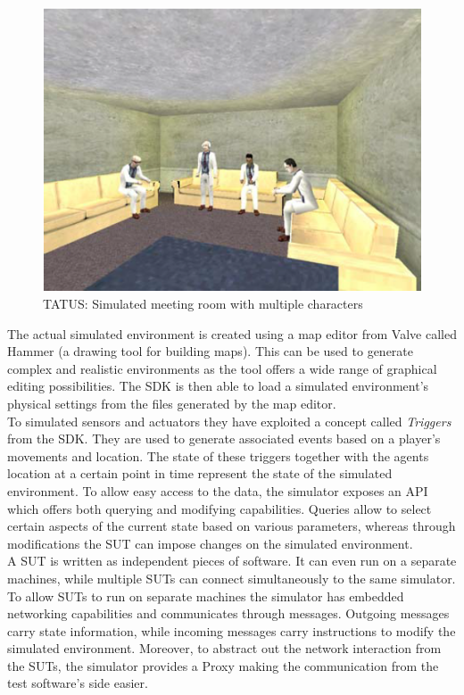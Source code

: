 \begin{figure}[H]
	\centering
	\includegraphics[width=\linewidth]{gfx/Chapter2/tatus_simulated_meeting_room}
	\caption{TATUS: Simulated meeting room with multiple characters}
	\label{fig:tatus_simulated_meeting_room}
\end{figure}

The actual simulated environment is created using a map editor from Valve called Hammer (a drawing tool for building maps). This can be used to generate complex and realistic environments as the tool offers a wide range of graphical editing possibilities. The SDK is then able to load a simulated environment's physical settings from the files generated by the map editor.\\

To simulated sensors and actuators they have exploited a concept called \emph{Triggers} from the SDK. They are used to generate associated events based on a player's movements and location. The state of these triggers together with the agents location at a certain point in time represent the state of the simulated environment. To allow easy access to the data, the simulator exposes an API which offers both querying and modifying capabilities. Queries allow to select certain aspects of the current state based on various parameters, whereas through modifications the SUT can impose changes on the simulated environment.\\

A SUT is written as independent pieces of software. It can even run on a separate machines, while multiple SUTs can connect simultaneously to the same simulator. To allow SUTs to run on separate machines the simulator has embedded networking capabilities and communicates through messages. Outgoing messages carry state information, while incoming messages carry instructions to modify the simulated environment. Moreover, to abstract out the network interaction from the SUTs, the simulator provides a Proxy making the communication from the test software's side easier.\\

